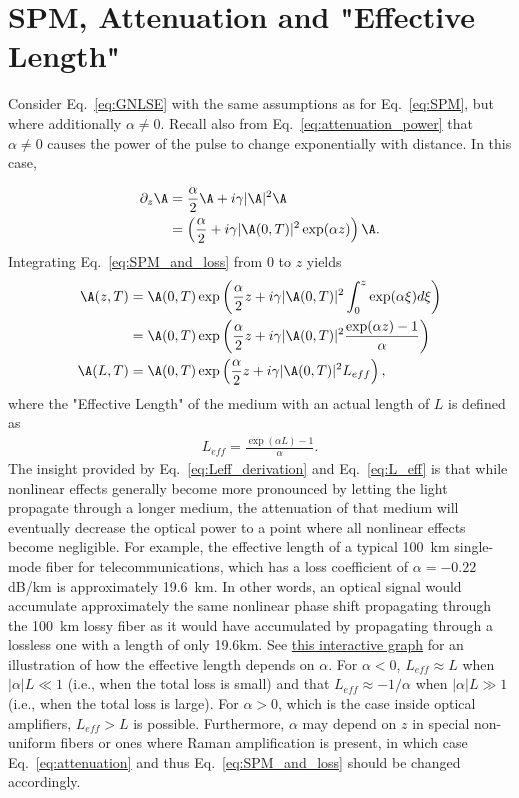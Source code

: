  


\section{SPM, Attenuation and "Effective Length"}
Consider Eq.~\ref{eq:GNLSE} with the same assumptions as for Eq.~\ref{eq:SPM}, but where additionally $\alpha\neq0$. Recall also from Eq.~\ref{eq:attenuation_power} that $\alpha\neq0$ causes the power of the pulse to change exponentially with distance. In this case,

\begin{align}
\label{eq:SPM_and_loss}
    \partial_z\A &= \frac{\alpha}{2}\A +i\gamma|\A|^2\A\\ \nonumber
    &=\left(\frac{\alpha}{2} +i\gamma |\A(0,T)|^2 \exp(\alpha z) \right)\A. 
\end{align}
Integrating Eq.~\ref{eq:SPM_and_loss} from $0$ to $z$ yields
\begin{align}
    \label{eq:Leff_derivation}
    \A(z,T)&=\A(0,T) \exp\left( \frac{\alpha}{2}z+i\gamma|\A(0,T)|^2 \int_0^z \exp(\alpha\xi) d\xi  \right) \\ \nonumber
    &=\A(0,T) \exp\left( \frac{\alpha}{2}z+i\gamma|\A(0,T)|^2  \frac{\exp(\alpha z)-1}{\alpha}   \right) \\ \nonumber
    \A(L,T)&=\A(0,T) \exp\left( \frac{\alpha}{2}z+i\gamma|\A(0,T)|^2  L_{eff}   \right),
\end{align}
where the "Effective Length" of the medium with an actual length of $L$ is defined as
\begin{align}
\label{eq:L_eff}
    L_{eff}= \frac{\exp(\alpha L)-1}{\alpha}.
\end{align}
The insight provided by Eq.~\ref{eq:Leff_derivation} and Eq.~\ref{eq:L_eff} is that while nonlinear effects generally become more pronounced by letting the light propagate through a longer medium, the attenuation of that medium will eventually decrease the optical power to a point where all nonlinear effects become negligible. For example, the effective length of a typical 100~km single-mode fiber for telecommunications, which has a loss coefficient of $\alpha=-0.22$dB/km is approximately 19.6~km. In other words, an optical signal would accumulate approximately the same nonlinear phase shift propagating through the 100~km lossy fiber as it would have accumulated by propagating through a lossless one with a length of only 19.6km. See \href{https://www.desmos.com/calculator/g6dadbxq33}{this interactive graph} for an illustration of how the effective length depends on $\alpha$. For $\alpha<0$, $L_{eff}\approx L$ when $|\alpha| L\ll 1$ (i.e., when the total loss is small) and that $L_{eff}\approx -1/\alpha$ when $|\alpha| L\gg 1$ (i.e., when the total loss is large). For $\alpha>0$, which is the case inside optical amplifiers, $L_{eff}>L$ is possible. Furthermore, $\alpha$ may depend on $z$ in special non-uniform fibers or ones where Raman amplification is present, in which case Eq.~\ref{eq:attenuation} and thus Eq.~\ref{eq:SPM_and_loss} should be changed accordingly.   


